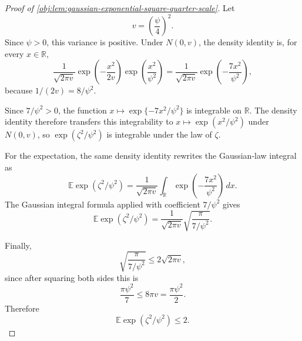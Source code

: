 \begin{proof}[Proof of \cref{obj:lem:gaussian-exponential-square-quarter-scale}]
Let
\[
v=\left(\frac{\psi}{4}\right)^2.
\]
Since \(\psi>0\), this variance is positive.  Under \(N(0,v)\), the density identity is, for every \(x\in\mathbb R\),
\[
\frac{1}{\sqrt{2\pi v}}\exp\!\left(-\frac{x^2}{2v}\right)
\exp\!\left(\frac{x^2}{\psi^2}\right)
=
\frac{1}{\sqrt{2\pi v}}
\exp\!\left(-\frac{7x^2}{\psi^2}\right),
\]
because \(1/(2v)=8/\psi^2\). %

Since \(7/\psi^2>0\), the function \(x\mapsto\exp\{-7x^2/\psi^2\}\) is integrable on \(\mathbb R\).  The density identity therefore transfers this integrability to \(x\mapsto\exp(x^2/\psi^2)\) under \(N(0,v)\), so \(\exp(\zeta^2/\psi^2)\) is integrable under the law of \(\zeta\). %

For the expectation, the same density identity rewrites the Gaussian-law integral as
\[
\mathbb E\exp(\zeta^2/\psi^2)
=
\frac{1}{\sqrt{2\pi v}}
\int_{\mathbb R}\exp\!\left(-\frac{7x^2}{\psi^2}\right)\,dx.
\]
The Gaussian integral formula applied with coefficient \(7/\psi^2\) gives
\[
\mathbb E\exp(\zeta^2/\psi^2)
=
\frac{1}{\sqrt{2\pi v}}
\sqrt{\frac{\pi}{7/\psi^2}}.
\]

Finally,
\[
\sqrt{\frac{\pi}{7/\psi^2}}
\le
2\sqrt{2\pi v},
\]
since after squaring both sides this is
\[
\frac{\pi\psi^2}{7}\le 8\pi v=\frac{\pi\psi^2}{2}.
\]
Therefore
\[
\mathbb E\exp(\zeta^2/\psi^2)\le2.
\]
\end{proof}
